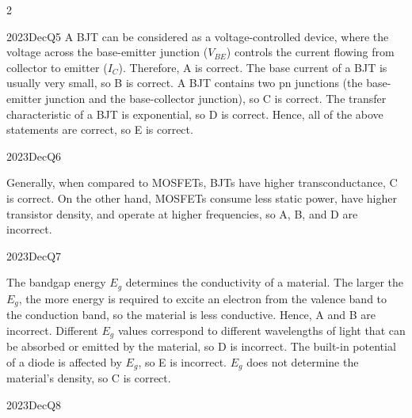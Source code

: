 \begin{multicols}{2}
\begin{qsolution}{2023}{Dec}{Q5}{\tgElectronics \tgElectronicsBJT}
    A BJT can be considered as a voltage-controlled device, where the voltage across the base-emitter junction ($V_{BE}$) controls the current flowing from collector to emitter ($I_C$).
    Therefore, A is correct.
    The base current of a BJT is usually very small, so B is correct.
    A BJT contains two pn junctions (the base-emitter junction and the base-collector junction), so C is correct.
    The transfer characteristic of a BJT is exponential, so D is correct.
    Hence, all of the above statements are correct, so E is correct.
\end{qsolution}

\begin{qsolution}{2023}{Dec}{Q6}{\tgElectronics \tgElectronicsBJT \tgElectronicsMOSFET}

    Generally, when compared to MOSFETs, BJTs have higher transconductance, C is correct.
    On the other hand, MOSFETs consume less static power, have higher transistor density, and operate at higher frequencies, so A, B, and D are incorrect.
\end{qsolution}

\begin{qsolution}{2023}{Dec}{Q7}{\tgElectronics \tgElectronicsSemiconductor}

    The bandgap energy $E_g$ determines the conductivity of a material.
    The larger the $E_g$, the more energy is required to excite an electron from the valence band to the conduction band, so the material is less conductive.
    Hence, A and B are incorrect.
    Different $E_g$ values correspond to different wavelengths of light that can be absorbed or emitted by the material, so D is incorrect.
    The built-in potential of a diode is affected by $E_g$, so E is incorrect.
    $E_g$ does not determine the material's density, so C is correct.
\end{qsolution}

\begin{qsolution}{2023}{Dec}{Q8}{\tgElectronics \tgElectronicsFibreOptics}


\end{qsolution}
\end{multicols}
